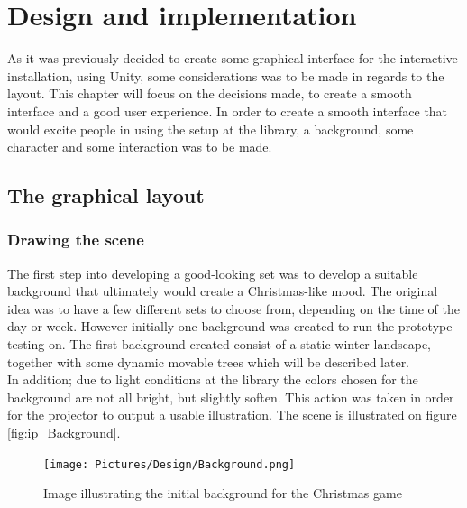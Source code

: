 \chapter{Design and implementation}\label{implementation}
As it was previously decided to create some graphical interface for the interactive installation, using Unity, some considerations was to be made in regards to the layout. This chapter will focus on the decisions made, to create a smooth interface and a good user experience. In order to create a smooth interface that would excite people in using the setup at the library, a background, some character and some interaction was to be made.

\section{The graphical layout}
\subsection{Drawing the scene}
The first step into developing a good-looking set was to develop a suitable background that ultimately would create a Christmas-like mood. The original idea was to have a few different sets to choose from, depending on the time of the day or week. However initially one background was created to run the prototype testing on. The first background created consist of a static winter landscape, together with some dynamic movable trees which will be described later.\\
In addition; due to light conditions at the library the colors chosen for the background are not all bright, but slightly soften. This action was taken in order for the projector to output a usable illustration. The scene is illustrated on  figure \eqref{fig:ip_Background}.

\begin{figure}[htbp]
\centering
\texttt{[image: Pictures/Design/Background.png]}
\caption{Image illustrating the initial background for the Christmas game}
\label{fig:ip_Background}
\end{figure}

